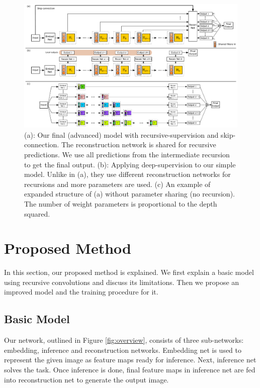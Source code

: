 \documentclass[10pt,twocolumn,letterpaper]{article}
\begin{document}
\begin{figure}[t]
\begin{center}
	\includegraphics[width=\textwidth]{figs/f3}
	\caption{(a): Our final (advanced) model with recursive-supervision and skip-connection. The reconstruction network is shared for recursive predictions. We use all predictions from the intermediate recursion to get the final output. (b): Applying deep-supervision \cite{lee2014deeply} to our simple model. Unlike in (a), they use different reconstruction networks for recursions and more parameters are used.  (c) An example of expanded structure of (a) without parameter sharing (no recursion). The number of weight parameters is proportional to the depth squared. }
\label{fig:recursive_supervision}
\end{center}
\end{figure}

\section{Proposed Method}
In this section, our proposed method is explained. We first explain a basic model using recursive convolutions and discuss its limitations. Then we propose an improved model and the training procedure for it.

\subsection{Basic Model}

Our network, outlined in Figure \ref{fig:overview}, consists of three sub-networks: embedding, inference and reconstruction networks. Embedding net is used to represent the given image as feature maps ready for inference. Next, inference net solves the task. Once inference is done, final feature maps in inference net are fed into reconstruction net to generate the output image.
\end{document}
